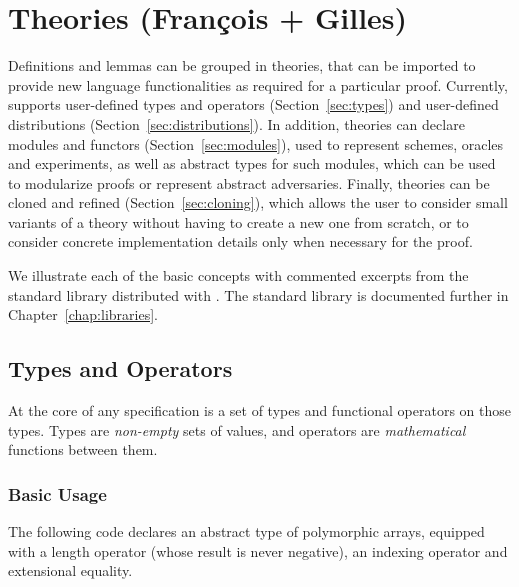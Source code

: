 
\chapter{Theories (Fran\c{c}ois + Gilles)\label{chap:theories}}

Definitions and lemmas can be grouped in theories, that can be imported to
provide new language functionalities as required for a particular proof.
Currently, \EC supports user-defined types and operators
(Section~\ref{sec:types}) and user-defined distributions
(Section~\ref{sec:distributions}). In addition, theories can declare modules and
functors (Section~\ref{sec:modules}), used to represent schemes, oracles and
experiments, as well as abstract types for such modules, which can be used to
modularize proofs or represent abstract adversaries. Finally, theories can be
cloned and refined (Section~\ref{sec:cloning}), which allows the user to
consider small variants of a theory without having to create a new one from
scratch, or to consider concrete implementation details only when necessary for
the proof.

We illustrate each of the basic concepts with commented excerpts from the
standard library distributed with \EC. The standard library is documented
further in Chapter~\ref{chap:libraries}.

\section{Types and Operators\label{sec:types}}

At the core of any \EC specification is a set of types and functional operators
on those types. Types are \emph{non-empty} sets of values, and operators are
\emph{mathematical} functions between them.


\subsection{Basic Usage}
The following \EC code declares an abstract type of polymorphic arrays, equipped
with a length operator (whose result is never negative), an indexing operator
and extensional equality.

